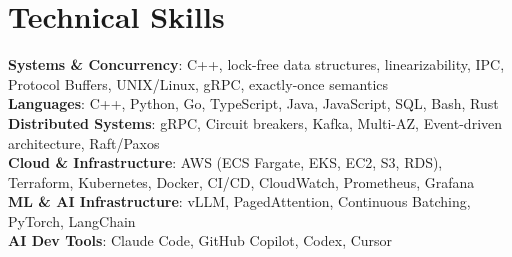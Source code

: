 \documentclass[letterpaper,11pt]{article}
\begin{document}
\section{Technical Skills}
\vspace{-7pt}
\begin{itemize}
[leftmargin=0.15in, label={}]\small{\item{
        \textbf{Systems \& Concurrency}{: C++, lock-free data structures, linearizability, IPC, Protocol Buffers, UNIX/Linux, gRPC, exactly-once semantics} \\
        \textbf{Languages}{: C++, Python, Go, TypeScript, Java, JavaScript, SQL, Bash, Rust} \\
        \textbf{Distributed Systems}{: gRPC, Circuit breakers, Kafka, Multi-AZ, Event-driven architecture, Raft/Paxos} \\
        \textbf{Cloud \& Infrastructure}{: AWS (ECS Fargate, EKS, EC2, S3, RDS), Terraform, Kubernetes, Docker, CI/CD, CloudWatch, Prometheus, Grafana} \\
        \textbf{ML \& AI Infrastructure}{: vLLM, PagedAttention, Continuous Batching, PyTorch, LangChain} \\
        \textbf{AI Dev Tools}{: Claude Code, GitHub Copilot, Codex, Cursor} \\
}}
\end{itemize}
\end{document}
